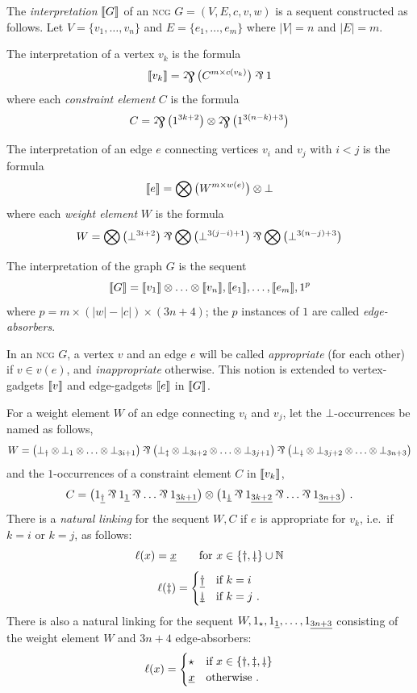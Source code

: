 \documentclass[conference,onecolumn]{IEEEtran}
\let\alt=\underline
\begin{document}
\begin{definition}
\label{def:graph interpretation}
The \emph{interpretation} $\llbracket G\rrbracket$ of an \textsc{ncg} $G=(V,E,c,v,w)$ is a sequent constructed as follows.
%
Let $V=\{v_1,\dotsc,v_n\}$ and $E=\{e_1,\dotsc,e_m\}$ where $|V|=n$ and $|E|=m$.

The interpretation of a vertex $v_k$ is the formula
\[
	\itn{v_k} = \bigparr\big(C^{m\times c(v_k)} \big)\parr 1
\]
where each \emph{constraint element} $C$ is the formula
\[
	C = \bigparr\big(1^{3k+2}\big) \tn \bigparr\big(1^{3(n-k)+3}\big)
\]

The interpretation of an edge $e$ connecting vertices $v_i$ and $v_j$ with $i<j$ is the formula
\[
	\llbracket e\rrbracket = \bigotimes\big(W^{m\times w(e)}\big)\otimes\bot
\]
where each \emph{weight element} $W$ is the formula
\[
	W = \bigotimes\big(\bot^{3i+2}\big)\parr\bigotimes\big(\bot^{3(j-i)+1}\big)\parr\bigotimes\big(\bot^{3(n-j)+3}\big)
\]

The interpretation of the graph $G$ is the sequent
\[
	\llbracket G\rrbracket = \llbracket v_1\rrbracket\otimes\dotso\otimes\llbracket v_n\rrbracket, \llbracket e_1\rrbracket,\dotsc,\llbracket e_m\rrbracket, 1^p
\]
where $p=m\times(|w|-|c|)\times(3n+4)$; the $p$ instances of $1$ are called \emph{edge-absorbers}.

\end{definition}



In an \textsc{ncg} $G$, a vertex $v$ and an edge $e$ will be called \emph{appropriate} (for each other) if $v\in v(e)$, and \emph{inappropriate} otherwise.
%
This notion is extended to vertex-gadgets $\llbracket v\rrbracket$ and edge-gadgets $\llbracket e\rrbracket$ in $\llbracket G\rrbracket$.



For a weight element $W$ of an edge connecting $v_i$ and $v_j$, let the $\bot$-occurrences be named as follows,
\[
	W =  \big(\named{    \dagger}\bot\tn\named{   1}\bot\tn\dotsc\tn\named{3i+1}\bot\big)
	\parr\big(\named{   \ddagger}\bot\tn\named{3i+2}\bot\tn\dotsc\tn\named{3j+1}\bot\big)
	\parr\big(\named{\downdagger}\bot\tn\named{3j+2}\bot\tn\dotsc\tn\named{3n+3}\bot\big)
\]
and the $1$-occurrences of a constraint element $C$ in $\llbracket v_k\rrbracket$,
\[
	C = \big(\named{\alt    \dagger}1\parr\named{\alt{   1}}1\parr\dotso\parr\named{\alt{3k+1}}1\big)
	\tn \big(\named{\alt\downdagger}1\parr\named{\alt{3k+2}}1\parr\dotso\parr\named{\alt{3n+3}}1\big)~.
\]
There is a \emph{natural linking} for the sequent $W,C$ if $e$ is appropriate for $v_k$, i.e.\ if $k=i$ or $k=j$, as follows:
\[
	\links(x) = \alt x \qquad \text{for }x\in\{\dagger,\downdagger\}\cup\mathbb N
\]
\[
	\links(\ddagger)=
	\begin{cases}
		\alt	\dagger & \text{if }k=i \\
		\alt\downdagger & \text{if }k=j~.
	\end{cases}
\]
There is also a natural linking for the sequent $W,\named\star 1,\named{\alt 1}1,\dotsc,\named{\alt {3n+3}}1$ consisting of the weight element $W$ and $3n+4$ edge-absorbers:
\[
	\links(x)=
	\begin{cases}
		\star  & \text{if }x\in\{\dagger,\ddagger,\downdagger\} \\
		\alt x & \text{otherwise }.
	\end{cases}
\]
\end{document}
